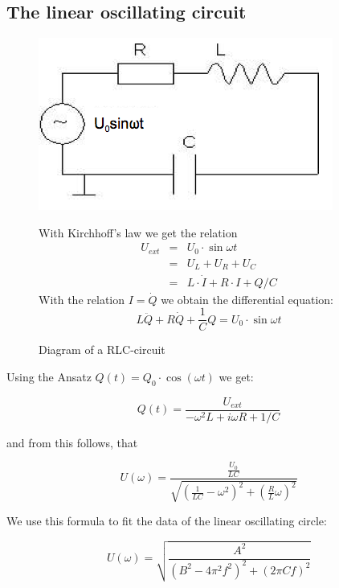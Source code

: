 \subsection{The linear oscillating circuit}
\begin{figure}[H]
\begin{minipage}{0.5\textwidth}
\includegraphics[width=\textwidth]{Bilder/lincirc.png}
\caption{Diagram of a RLC-circuit}
\end{minipage}
\begin{minipage}{0.5\textwidth}
With Kirchhoff's law we get the relation \begin{eqnarray*}  
U_{ext} &=& U_0\cdot\sin\omega t \\
&=& U_L + U_R + U_C\\
&=& L\cdot \dot I + R\cdot I + Q/C
\end{eqnarray*}
With the relation $I = \dot Q$ we obtain the differential equation:
$$ L\ddot Q + R \dot Q + \frac{1}{C}Q = U_0\cdot\sin \omega t $$
\end{minipage}
\end{figure}

Using the Ansatz $Q(t) = Q_0 \cdot\cos(\omega t)$ we get:

$$Q(t) = \frac{U_{ext}}{-\omega^2L+i\omega R + 1/C}$$

and from this follows, that

$$U(\omega) = \frac{ \frac{U_0}{LC} }{ \sqrt{ (\frac{1}{LC} - \omega^2 )^2+ (\frac{R}{L}\omega)^2}}$$

We use this formula to fit the data of the linear oscillating circle:

\begin{equation} U(\omega) = \sqrt{\frac{A^2}{(B^2-4\pi^2f^2)^2 + (2\pi Cf)^2}} \end{equation}

